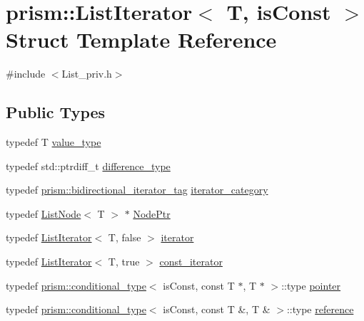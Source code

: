 \hypertarget{structprism_1_1_list_iterator}{}\section{prism\+:\+:List\+Iterator$<$ T, is\+Const $>$ Struct Template Reference}
\label{structprism_1_1_list_iterator}


{\ttfamily \#include $<$List\+\_\+priv.\+h$>$}

\subsection*{Public Types}
\begin{DoxyCompactItemize}
\item 
typedef T \hyperlink{structprism_1_1_list_iterator_a8b0844caeee92f469961951784b675fa}{value\+\_\+type}
\item 
typedef std\+::ptrdiff\+\_\+t \hyperlink{structprism_1_1_list_iterator_a81d24e551a1b9ef7397d37b7d92511cf}{difference\+\_\+type}
\item 
typedef \hyperlink{structprism_1_1bidirectional__iterator__tag}{prism\+::bidirectional\+\_\+iterator\+\_\+tag} \hyperlink{structprism_1_1_list_iterator_ae5286e35b86909c6990d328423bf3641}{iterator\+\_\+category}
\item 
typedef \hyperlink{structprism_1_1_list_node}{List\+Node}$<$ T $>$ $\ast$ \hyperlink{structprism_1_1_list_iterator_aad2175a44d3db4fd84059ae15158b174}{Node\+Ptr}
\item 
typedef \hyperlink{structprism_1_1_list_iterator}{List\+Iterator}$<$ T, false $>$ \hyperlink{structprism_1_1_list_iterator_a91ccdd8512cbc8314d784e39ed4597dd}{iterator}
\item 
typedef \hyperlink{structprism_1_1_list_iterator}{List\+Iterator}$<$ T, true $>$ \hyperlink{structprism_1_1_list_iterator_aec39e76f7b988d0718fa4e2aea52ed34}{const\+\_\+iterator}
\item 
typedef \hyperlink{structprism_1_1conditional__type}{prism\+::conditional\+\_\+type}$<$ is\+Const, const T $\ast$, T $\ast$ $>$\+::type \hyperlink{structprism_1_1_list_iterator_adb94db3cc26f2df6b6962b756b6fa3c3}{pointer}
\item 
typedef \hyperlink{structprism_1_1conditional__type}{prism\+::conditional\+\_\+type}$<$ is\+Const, const T \&, T \& $>$\+::type \hyperlink{structprism_1_1_list_iterator_a8a07c86e6d1ef38b0f7d390ad7c05c22}{reference}
\item 

\end{DoxyCompactItemize}
